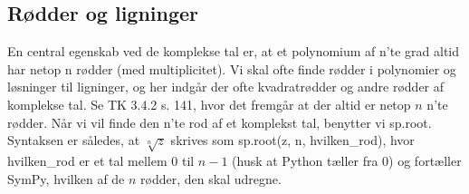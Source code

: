 \documentclass[letterpaper,10pt,english]{jupyterBook}
\begin{document}
\begin{sphinxVerbatim}[commandchars=\\\{\}]
  
    
\end{sphinxVerbatim}

\noindent{}

\noindent{}

\noindent{}

\begin{sphinxVerbatim}[commandchars=\\\{\}]
\end{sphinxVerbatim}

\noindent{}

\noindent{}


\subsection{Rødder og ligninger}
\label{\detokenize{notebooks/sympy/Notebook_kompleks:rodder-og-ligninger}}
En central egenskab ved de komplekse tal er, at et polynomium af n’te grad altid har netop n rødder (med multiplicitet). Vi skal ofte finde rødder i polynomier og løsninger til ligninger, og her indgår der ofte kvadratrødder og andre rødder af komplekse tal. Se TK 3.4.2 s. 141, hvor det fremgår at der altid er netop \(n\) n’te rødder. Når vi vil finde den n’te rod af et komplekst tal, benytter vi sp.root. Syntaksen er således, at \(\sqrt[n]{z}\) skrives som sp.root(z, n, hvilken\_rod), hvor hvilken\_rod er et tal mellem \(0\) til \(n-1\) (husk at Python tæller fra 0) og fortæller SymPy, hvilken af de \(n\) rødder, den skal udregne.

\begin{sphinxVerbatim}[commandchars=\\\{\}]
       
\end{sphinxVerbatim}
\end{document}
